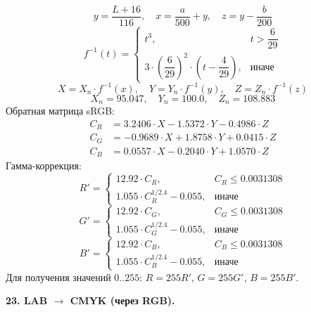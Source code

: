 \documentclass[12pt,a4paper]{article}
\begin{document}
\[
y = \frac{L + 16}{116},\quad x = \frac{a}{500} + y,\quad z = y - \frac{b}{200}
\]
\[
f^{-1}(t) = \begin{cases} t^3, & t > \dfrac{6}{29} \\[8pt] 3 \cdot \left( \dfrac{6}{29} \right)^2 \cdot \left( t - \dfrac{4}{29} \right), & \text{иначе} \end{cases}
\]
\[
X = X_n \cdot f^{-1}(x),\quad Y = Y_n \cdot f^{-1}(y),\quad Z = Z_n \cdot f^{-1}(z)
\]
\[
X_n = 95.047,\quad Y_n = 100.0,\quad Z_n = 108.883
\]
Обратная матрица sRGB:
\begin{align*}
C_R &= 3.2406 \cdot X - 1.5372 \cdot Y - 0.4986 \cdot Z \\
C_G &= -0.9689 \cdot X + 1.8758 \cdot Y + 0.0415 \cdot Z \\
C_B &= 0.0557 \cdot X - 0.2040 \cdot Y + 1.0570 \cdot Z
\end{align*}
Гамма-коррекция:
\[
R' = \begin{cases} 12.92 \cdot C_R, & C_R \le 0.0031308 \\[8pt] 1.055 \cdot C_R^{1/2.4} - 0.055, & \text{иначе} \end{cases}
\]
\[
G' = \begin{cases} 12.92 \cdot C_G, & C_G \le 0.0031308 \\[8pt] 1.055 \cdot C_G^{1/2.4} - 0.055, & \text{иначе} \end{cases}
\]
\[
B' = \begin{cases} 12.92 \cdot C_B, & C_B \le 0.0031308 \\[8pt] 1.055 \cdot C_B^{1/2.4} - 0.055, & \text{иначе} \end{cases}
\]
Для получения значений \(0..255\): \(R = 255 R'\), \(G = 255 G'\), \(B = 255 B'\).

\textbf{23. LAB \(\to\) CMYK (через RGB).}
\end{document}
